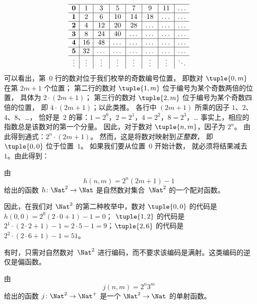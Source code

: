 \documentclass[../../../include/open-logic-section]{subfiles}
\begin{document}
\begin{explain}
\[\begin{array}{ c | c | c | c | c | c | c | c }
\hline
\mathbf 0 & 1 & 3 & 5 & 7 & 9 & 11 & \dots \\
\hline
\mathbf 1 & 2 & 6 & 10 & 14 & 18 & \dots & \dots \\
\hline
\mathbf 2 & 4 & 12 & 20 & 28 & \dots & \dots & \dots \\
\hline
\mathbf 3 & 8 & 24 & 40 & \dots & \dots & \dots & \dots \\
\hline
\mathbf 4 & 16 & 48 & \dots & \dots & \dots & \dots & \dots \\
\hline
\mathbf 5 & 32 & \dots & \dots & \dots & \dots & \dots & \dots \\
\hline
\vdots & \vdots & \vdots & \vdots & \vdots & \vdots & \vdots & \ddots\\
\end{array}
\]
可以看出，第~$0$ 行的数对位于我们枚举的奇数编号位置，
即数对 $\tuple{0,m}$ 在第 $2m+1$ 个位置；
第二行的数对 $\tuple{1,m}$ 位于编号为某个奇数两倍的位置，
具体为 $2 \cdot (2m+1)$；
第三行的数对 $\tuple{2,m}$ 位于编号为某个奇数四倍的位置，
即 $4 \cdot (2m+1)$；以此类推。
各行中 $(2m+1)$ 所乘的因子 $1$、$2$、$4$、$8$、\dots，
恰好是~$2$ 的幂：$1= 2^0$，$2 = 2^1$，$4 = 2^2$，$8 = 2^3$，\dots\@
事实上，相应的指数总是该数对的第一个分量。
因此，对于数对 $\tuple{n,m}$，因子为 $2^n$。
由此得到通式：$2^n \cdot (2m+1)$。
然而，这是将数对映射到\emph{正整数}，
即 $\tuple{0,0}$ 位于位置~$1$。
如果我们要从位置~$0$ 开始计数，
就必须将结果减去~$1$。由此得到：
\end{explain}

\begin{ex}
由
\[
h(n,m) = 2^n (2m+1) - 1
\]
给出的函数 $h\colon \Nat^2 \to \Nat$ 是自然数对集合~$\Nat^2$ 的一个配对函数。
\end{ex}

\begin{explain}
因此，在我们对 $\Nat^2$ 的第二种枚举中，数对 $\tuple{0,0}$ 的代码是 $h(0,0) = 2^0(2\cdot 0+1) - 1 = 0$；
$\tuple{1,2}$ 的代码是 $2^{1} \cdot (2 \cdot 2 + 1) - 1 = 2
\cdot 5 - 1 = 9$；$\tuple{2,6}$ 的代码是 $2^{2} \cdot (2
\cdot 6 + 1) - 1 = 51$。
\end{explain}

有时，只需对自然数对~$\Nat^2$ 进行编码，而不要求该编码是满射。这类编码的逆仅是偏函数。

\begin{ex}
由
\[
j(n,m) = 2^n3^m
\]
给出的函数 $j\colon \Nat^2 \to \Nat^+$ 是一个 $\Nat^2 \to \Nat$ 的单射函数。
\end{ex}
\end{document}

